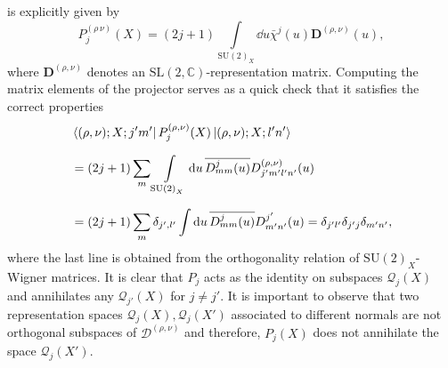 \documentclass[11pt,a4paper]{article}
\newcommand{\C}{\mathbb C}
\newcommand{\SU}{\text{SU$(2)$}}
\newcommand{\SL}{\text{SL$(2,\C)$}}
\begin{document}
%
is explicitly given by 
%
\begin{equation}
P_j^{(\rho\,\nu)}(X) = (2j+1)\int\limits_{\SU_X}\dd{u}\bar{\chi}^j(u)\mathbf{D}^{(\rho,\nu)}(u),
\end{equation}
%
where $\mathbf{D}^{(\rho,\nu)}$ denotes an $\SL$-representation matrix. Computing the matrix elements of the projector serves as a quick check that it satisfies the correct properties
%
\begin{equation}\label{eq:matrix elements of projector}
\begin{aligned}
& \bra{(\rho,\nu);X;j'm'}P_j^{(\rho,\nu)}(X)\ket{(\rho,\nu);X;l'n'}\\[7pt]
& =
(2j+1)\sum_{m}\int\limits_{\SU_X}\dd{u}\overline{D^j_{mm}(u)}D^{(\rho,\nu)}_{j'm'l'n'}(u)\\[7pt]
& =
(2j+1)\sum_m \delta_{j',l'}\int\dd{u}\overline{D^j_{mm}(u)}D^{j'}_{m'n'}(u)
=
\delta_{j'l'}\delta_{j'j}\delta_{m'n'},
\end{aligned}
\end{equation}
%
where the last line is obtained from the orthogonality relation of $\SU_X$-Wigner matrices. It is clear that $P_j$ acts as the identity on subspaces $\mathcal{Q}_j(X)$ and annihilates any $\mathcal{Q}_{j'}(X)$ for $j\neq j'$. It is important to observe that two representation spaces $\mathcal{Q}_j(X),\mathcal{Q}_j(X')$ associated to different normals are not orthogonal subspaces of $\mathcal{D}^{(\rho,\nu)}$ and therefore, $P_j(X)$ does not annihilate the space $\mathcal{Q}_j(X')$.
\end{document}
